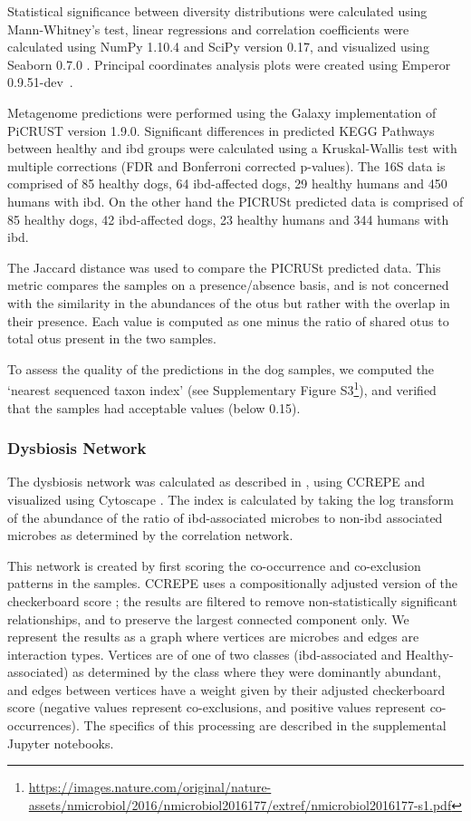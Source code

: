 Statistical significance between diversity distributions were calculated using Mann-Whitney's test, linear regressions and correlation coefficients were calculated using NumPy 1.10.4 \cite{RN3823} and SciPy version 0.17, and visualized using Seaborn 0.7.0 \cite{RN170}. Principal coordinates analysis plots were created using Emperor 0.9.51-dev~\cite{RN3730}.

Metagenome predictions were performed using the Galaxy implementation of PiCRUST version 1.9.0. Significant differences in predicted KEGG Pathways between healthy and \gls{ibd} groups were calculated using a Kruskal-Wallis test with multiple corrections (FDR and Bonferroni corrected p-values). The 16S data is comprised of 85 healthy dogs, 64 \gls{ibd}-affected dogs, 29 healthy humans and 450 humans with \gls{ibd}. On the other hand the PICRUSt predicted data is comprised of 85 healthy dogs, 42 \gls{ibd}-affected dogs, 23 healthy humans and 344 humans with \gls{ibd}.

The Jaccard distance was used to compare the PICRUSt predicted data. This metric compares the samples on a presence/absence basis, and is not concerned with the similarity in the abundances of the \glspl{otu} but rather with the overlap in their presence. Each value is computed as one minus the ratio of shared \glspl{otu} to total \glspl{otu} present in the two samples.

To assess the quality of the predictions in the dog samples, we computed the `nearest sequenced taxon index' (see Supplementary Figure S3\footnote{\url{https://images.nature.com/original/nature-assets/nmicrobiol/2016/nmicrobiol2016177/extref/nmicrobiol2016177-s1.pdf}}), and verified that the samples had acceptable values (below 0.15).

\subsubsection{Dysbiosis Network}

The dysbiosis network was calculated as described in \cite{RN154}, using CCREPE \cite{RN168} and visualized using Cytoscape \cite{RN169}. The index is calculated by taking the log transform of the abundance of the ratio of \gls{ibd}-associated microbes to non-\gls{ibd} associated microbes as determined by the correlation network.

This network is created by first scoring the co-occurrence and co-exclusion patterns in the samples. CCREPE uses a compositionally adjusted version of the checkerboard score \cite{RN3985}; the results are filtered to remove non-statistically significant relationships, and to preserve the largest connected component only. We represent the results as a graph where vertices are microbes and edges are interaction types. Vertices are of one of two classes (\gls{ibd}-associated and Healthy-associated) as determined by the class where they were dominantly abundant, and edges between vertices have a weight given by their adjusted checkerboard score (negative values represent co-exclusions, and positive values represent co-occurrences). The specifics of this processing are described in the supplemental Jupyter notebooks.

